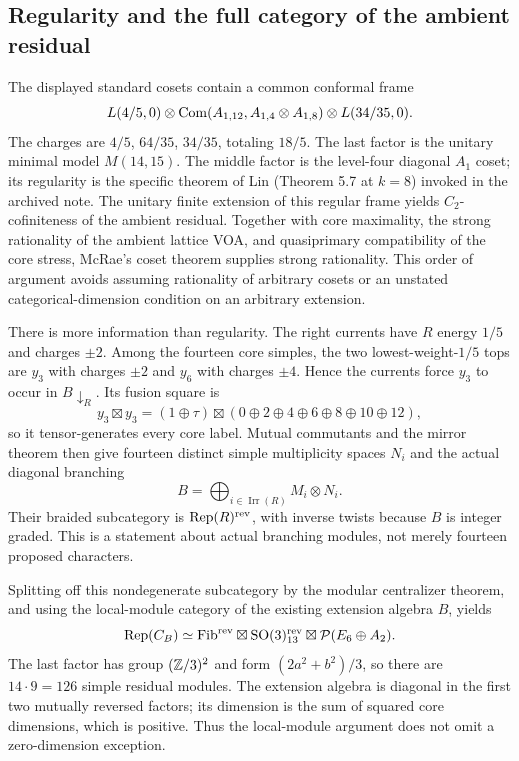\subsection{Regularity and the full category of the ambient residual}

The displayed standard cosets contain a common conformal frame
\[
 L(4/5,0)\otimes
 \operatorname{Com}(A_{1,12},A_{1,4}\otimes A_{1,8})\otimes L(34/35,0).
\]
The charges are $4/5$, $64/35$, $34/35$, totaling $18/5$.
The last factor is the unitary minimal model $M(14,15)$. The
middle factor is the level-four diagonal $A_1$ coset; its
regularity is the specific theorem of Lin (Theorem 5.7 at $k=8$)
invoked in the archived note. The unitary finite extension of this
regular frame yields $C_2$-cofiniteness of the ambient residual.
Together with core maximality, the strong rationality of the
ambient lattice VOA, and quasiprimary compatibility of the core
stress, McRae's coset theorem supplies strong rationality. This
order of argument avoids assuming rationality of arbitrary cosets
or an unstated categorical-dimension condition on an arbitrary
extension.

There is more information than regularity. The right currents
have $R$ energy $1/5$ and charges $\pm2$. Among the fourteen core
simples, the two lowest-weight-$1/5$ tops are $y_3$ with charges
$\pm2$ and $y_6$ with charges $\pm4$. Hence the currents force
$y_3$ to occur in $B\downarrow_R$. Its fusion square is
\[
 y_3\boxtimes y_3
 =(1\oplus\tau)\boxtimes
 (0\oplus2\oplus4\oplus6\oplus8\oplus10\oplus12),
\]
so it tensor-generates every core label. Mutual commutants and
the mirror theorem then give fourteen distinct simple
multiplicity spaces $N_i$ and the actual diagonal branching
\[
 B=\bigoplus_{i\in\operatorname{Irr}(R)}M_i\otimes N_i.
\]
Their braided subcategory is $\operatorname{Rep}(R)^{\rm rev}$, with inverse
twists because $B$ is integer graded. This is a statement about
actual branching modules, not merely fourteen proposed characters.

Splitting off this nondegenerate subcategory by the modular
centralizer theorem, and using the local-module category of the
existing extension algebra $B$, yields
\begin{equation}
 \operatorname{Rep}(C_B)\simeq
 \mathrm{Fib}^{\rm rev}\boxtimes\mathrm{SO}(3)_{13}^{\rm rev}
 \boxtimes\mathcal P(E_6\oplus A_2).
 \label{expstructure:CB-category}
\end{equation}
The last factor has group $(\mathbb Z/3)^2$ and form
$(2a^2+b^2)/3$, so there are $14\cdot9=126$ simple residual
modules. The extension algebra is diagonal in the first two
mutually reversed factors; its dimension is the sum of squared
core dimensions, which is positive. Thus the local-module
argument does not omit a zero-dimension exception.

